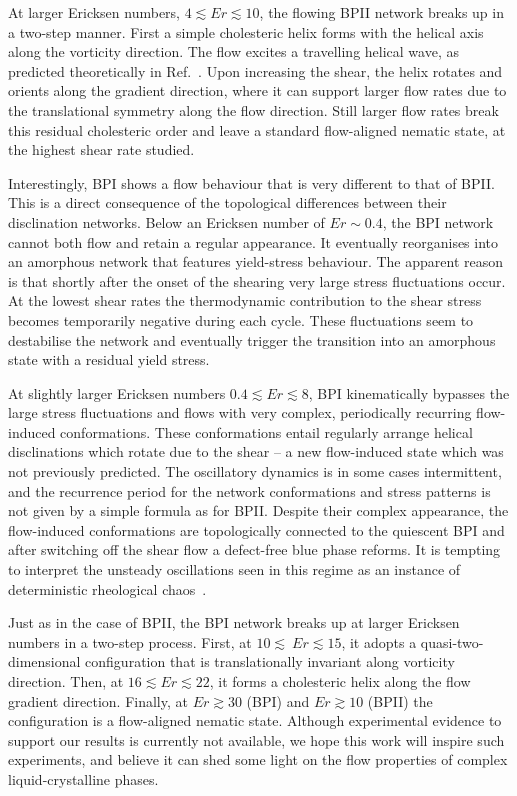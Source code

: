 \documentclass[8.5pt,twoside,twocolumn]{article}
\begin{document}
At larger Ericksen numbers, $4\lesssim Er\lesssim 10$, the flowing BPII network 
breaks up in a two-step manner. First a simple cholesteric helix forms with the helical axis 
along the vorticity direction. The flow excites a travelling helical wave,
as predicted theoretically in Ref.~\cite{Rey:1996a,Rey:1996b}.
Upon increasing the shear, the helix rotates and orients along the
gradient direction, where it can support larger flow rates due to the translational
symmetry along the flow direction. Still larger flow rates break this residual
cholesteric order and leave a standard flow-aligned nematic state,
at the highest shear rate studied.

Interestingly, BPI shows a flow behaviour that is very different to that of BPII.
This is a direct consequence of the topological differences between their disclination 
networks. Below an Ericksen number of $Er\sim 0.4$, the BPI network cannot both flow and 
retain a regular appearance. It eventually reorganises into an amorphous network that
features yield-stress behaviour. The apparent reason is that shortly after the onset of the shearing 
very large stress fluctuations occur. At the lowest shear rates
the thermodynamic contribution to the shear stress becomes temporarily 
negative during each cycle. These fluctuations seem to destabilise the network and 
eventually trigger the transition into an amorphous state with a residual yield
stress. 

At slightly larger Ericksen numbers $0.4\lesssim Er \lesssim8$,
BPI kinematically bypasses the large stress fluctuations and 
flows with very complex, periodically recurring flow-induced conformations.
These conformations entail regularly arrange helical disclinations which 
rotate due to the shear -- a new flow-induced state which was not previously
predicted. 
The oscillatory dynamics is in some cases intermittent, and the
recurrence period for the network conformations and stress patterns
is not given by a simple formula as for BPII.
Despite their complex appearance, the flow-induced conformations are 
topologically connected to the quiescent BPI and after switching off the 
shear flow a defect-free blue phase reforms. It is tempting to
interpret the unsteady oscillations seen in this regime as an instance of 
deterministic rheological chaos~\cite{fielding, Cates:2002}.

Just as in the case of BPII, the BPI network breaks up at larger Ericksen numbers in
a two-step process. First, at $10\lesssim\ Er\lesssim 15$, it adopts a 
quasi-two-dimensional configuration that is translationally invariant along vorticity direction. 
Then, at $16\lesssim Er \lesssim 22$, it forms a cholesteric helix along the flow gradient 
direction.  Finally, at $Er\gtrsim30$ (BPI) and $Er\gtrsim10$ (BPII) the configuration
is a flow-aligned nematic state.
Although experimental evidence to support
our results is currently not available, we hope this work will inspire such experiments, and believe it can shed some light 
on the flow properties of complex liquid-crystalline phases.
\end{document}
